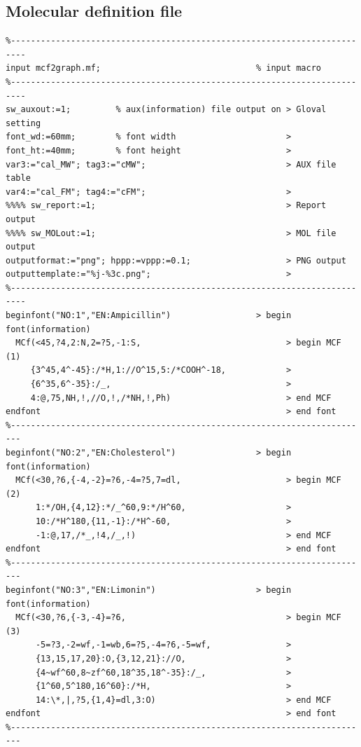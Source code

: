 \documentclass[a4paper]{article}
\begin{document}
\subsection{Molecular definition file}
\begin{verbatim}
%-------------------------------------------------------------------------
input mcf2graph.mf;                               % input macro
%-------------------------------------------------------------------------
sw_auxout:=1;         % aux(information) file output on > Gloval setting
font_wd:=60mm;        % font width                      > 
font_ht:=40mm;        % font height                     >
var3:="cal_MW"; tag3:="cMW";                            > AUX file table
var4:="cal_FM"; tag4:="cFM";                            >
%%%% sw_report:=1;                                      > Report output
%%%% sw_MOLout:=1;                                      > MOL file output
outputformat:="png"; hppp:=vppp:=0.1;                   > PNG output
outputtemplate:="%j-%3c.png";                           >
%-------------------------------------------------------------------------
beginfont("NO:1","EN:Ampicillin")                 > begin font(information)
  MCf(<45,?4,2:N,2=?5,-1:S,                             > begin MCF (1)
     {3^45,4^-45}:/*H,1://O^15,5:/*COOH^-18,            >
     {6^35,6^-35}:/_,                                   >
     4:@,75,NH,!,//O,!,/*NH,!,Ph)                       > end MCF 
endfont                                                 > end font
%------------------------------------------------------------------------
beginfont("NO:2","EN:Cholesterol")                > begin font(information)
  MCf(<30,?6,{-4,-2}=?6,-4=?5,7=dl,                     > begin MCF (2)
      1:*/OH,{4,12}:*/_^60,9:*/H^60,                    >
      10:/*H^180,{11,-1}:/*H^-60,                       >
      -1:@,17,/*_,!4,/_,!)                              > end MCF
endfont                                                 > end font
%------------------------------------------------------------------------
beginfont("NO:3","EN:Limonin")                    > begin font(information)
  MCf(<30,?6,{-3,-4}=?6,                                > begin MCF (3)
      -5=?3,-2=wf,-1=wb,6=?5,-4=?6,-5=wf,               >
      {13,15,17,20}:O,{3,12,21}://O,                    >
      {4~wf^60,8~zf^60,18^35,18^-35}:/_,                >
      {1^60,5^180,16^60}:/*H,                           >
      14:\*,|,?5,{1,4}=dl,3:O)                          > end MCF
endfont                                                 > end font
%------------------------------------------------------------------------

\end{verbatim}
\end{document}
